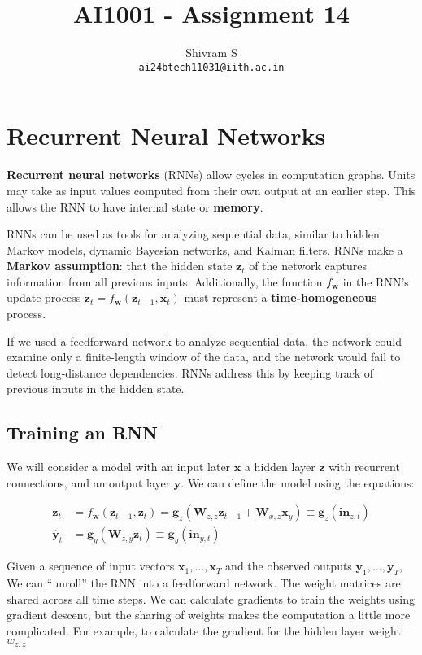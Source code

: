 \documentclass{article}
\author{Shivram S \\ \texttt{ai24btech11031@iith.ac.in}}
\title{AI1001 - Assignment 14}
\renewcommand{\vec}[1]{\textbf{#1}}
\begin{document}
\maketitle

\section{Recurrent Neural Networks}

\textbf{Recurrent neural networks} (RNNs) allow cycles in computation graphs. Units 
may take as input values computed from their own output at an earlier step. This allows
the RNN to have internal state or \textbf{memory}.

RNNs can be used as tools for analyzing sequential data, similar to hidden Markov models,
dynamic Bayesian networks, and Kalman filters. RNNs make a \textbf{Markov assumption}:
that the hidden state $\vec{z}_t$ of the network captures information from all previous
inputs. Additionally, the function $f_{\vec{w}}$ in the RNN's update process
$\vec{z}_t = f_{\vec{w}}(\vec{z}_{t-1}, \vec{x}_t)$ must represent a
\textbf{time-homogeneous} process.

If we used a feedforward network to analyze sequential data, the network could examine
only a finite-length window of the data, and the network would fail to detect
long-distance dependencies. RNNs address this by keeping track of previous inputs
in the hidden state.
 
\subsection{Training an RNN}

We will consider a model with an input later $\vec{x}$ a hidden layer $\vec{z}$ with
recurrent connections, and an output layer $\vec{y}$. We can define the model using the
equations:

\begin{align*}
\vec{z}_t  &= f_{\vec{w}}(\vec{z}_{t-1}, \vec{z}_t) = \vec{g}_z(\vec{W}_{z,z}\vec{z}_{t-1} + \vec{W}_{x,z}\vec{x}_y) \equiv \vec{g}_z(\vec{in}_{z,t})\\
\mathbf{\hat y}_t &= \vec{g}_y(\vec{W}_{z,y}\vec{z}_t) \equiv \vec{g}_y(\vec{in}_{y,t})
\end{align*}

Given a sequence of input vectors $\vec{x}_1, \dots, \vec{x}_T$ and the observed
outputs $\vec{y}_1, \dots, \vec{y}_T$, We can ``unroll'' the RNN into a feedforward
network. The weight matrices are shared across all time steps. We can calculate gradients
to train the weights using gradient descent, but the sharing of weights makes the
computation a little more complicated. For example, to calculate the gradient for the
hidden layer weight $w_{z,z}$
\end{document}
